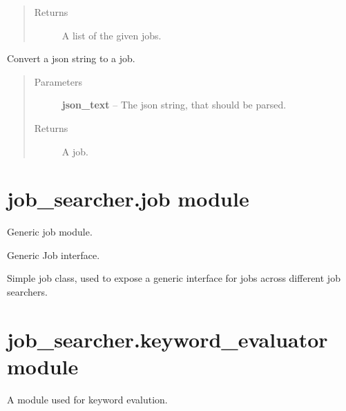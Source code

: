 \documentclass[letterpaper,10pt,english]{sphinxmanual}
\begin{document}
\begin{fulllineitems}
\begin{fulllineitems}
\begin{quote}
\begin{description}
\item[{Returns}] \leavevmode
A list of the given jobs.

\end{description}\end{quote}

\end{fulllineitems}


\begin{fulllineitems}
\label{job_searcher:job_searcher.go_jobs.GoJobs.json_to_job}
Convert a json string to a job.
\begin{quote}\begin{description}
\item[{Parameters}] \leavevmode
\textbf{json\_text} -- The json string, that should be parsed.

\item[{Returns}] \leavevmode
A job.

\end{description}\end{quote}

\end{fulllineitems}


\end{fulllineitems}



\section{job\_searcher.job module}
\label{job_searcher:module-job_searcher.job}\label{job_searcher:job-searcher-job-module}
Generic job module.

\begin{fulllineitems}
\label{job_searcher:job_searcher.job.Job}
Generic Job interface.

Simple job class, used to expose a generic interface for jobs
across different job searchers.

\end{fulllineitems}



\section{job\_searcher.keyword\_evaluator module}
\label{job_searcher:module-job_searcher.keyword_evaluator}\label{job_searcher:job-searcher-keyword-evaluator-module}
A module used for keyword evalution.
\end{document}
